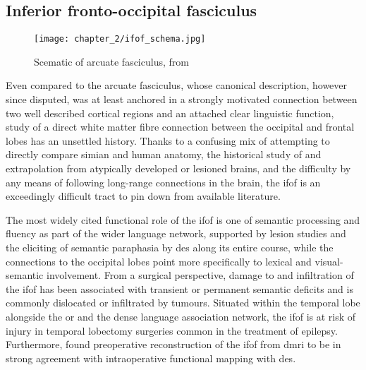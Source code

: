 \subsection{Inferior fronto-occipital fasciculus}


\begin{SCfigure}[][htb!]
  \texttt{[image: chapter\_2/ifof\_schema.jpg]}
  \caption{ Scematic of arcuate fasciculus, from \textcite{Geschwind1970}}
  \label{fig:ifof}
\end{SCfigure}

Even compared to the arcuate fasciculus, whose canonical description, however since disputed, was at least anchored in a strongly motivated connection between two well described cortical regions and an attached clear linguistic function, study of a direct white matter fibre connection between the occipital and frontal lobes has an unsettled history.\autocite{Forkel2014a}
Thanks to a confusing mix of attempting to directly compare simian and human anatomy,\autocite{Schmahmann2007,ThiebautdeSchotten2012,Mandonnet2018,Sarubbo2019} the historical study of and extrapolation from atypically developed or lesioned brains,\autocite{Schmahmann2007,Forkel2014a} and the difficulty by any means of following long-range connections in the brain,
\autocite{Martino2010} the \gls{ifof} is an exceedingly difficult tract to pin down from available literature.\autocite{Sarubbo2019,Weiller2021}

The most widely cited functional role of the \gls{ifof} is one of semantic processing and fluency as part of the wider language network, supported by lesion studies\autocite{Ille2018b,Almairac2015} and the eliciting of semantic paraphasia by \gls{des} along its entire course,\autocite{Duffau2013a,Herbet2017,Voets2017,Vigren2020a} while the connections to the occipital lobes point more specifically to lexical and visual-semantic involvement.
\autocite{Martino2010,Rollans2017,Rollans2018}
From a surgical perspective, damage to and infiltration of the \gls{ifof} has been associated with transient or permanent semantic deficits and is commonly dislocated or infiltrated by tumours. \autocite{Almairac2015,Voets2017,Altieri2019,Binding2023}
Situated within the temporal lobe alongside the \gls{or} and the dense language association network, the \gls{ifof} is at risk of injury in temporal lobectomy surgeries common in the treatment of epilepsy. \autocite{Baran2020,Shah2022,Binding2023}
Furthermore, \textcite{Bello2010d} found preoperative reconstruction of the \gls{ifof} from \gls{dmri} to be in strong agreement with intraoperative functional mapping with \gls{des}.

